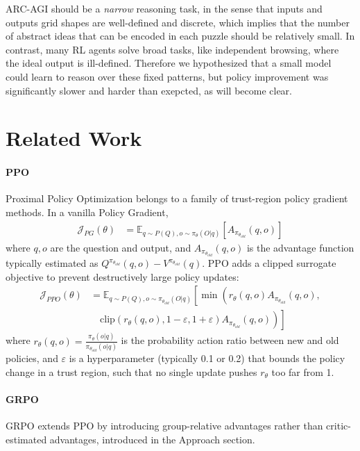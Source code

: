\documentclass{article}
\begin{document}
ARC-AGI should be a \textit{narrow} reasoning task, in the sense that inputs and outputs grid shapes are well-defined and discrete, which implies that the number of abstract ideas that can be encoded in each puzzle should be relatively small. In contrast, many RL agents solve broad tasks, like independent browsing, where the ideal output is ill-defined. Therefore we hypothesized that a small model could learn to reason over these fixed patterns, but policy improvement was significantly slower and harder than exepcted, as will become clear.

\section{Related Work}



\paragraph{PPO} Proximal Policy Optimization \cite{PPO} belongs to a family of trust-region policy gradient methods. In a vanilla Policy Gradient,
\begin{align*}
  \mathcal{J}_{PG}(\theta) & = \mathbb{E}_{q \sim P(Q), o \sim \pi_\theta(O|q)}[A_{\pi_{\theta_{old}}}(q, o)]
\end{align*}
where $q,o$ are the question and output, and $A_{\pi_{\theta_{old}}}(q, o)$ is the advantage function typically estimated as $Q^{\pi_{\theta_{old}}}(q,o) - V^{\pi_{\theta_{old}}}(q)$. PPO adds a clipped surrogate objective to prevent destructively large policy updates:
\begin{align*}
  \mathcal{J}_{PPO}(\theta) & = \mathbb{E}_{q \sim P(Q), o \sim \pi_{\theta_{old}}(O|q)}\left[\min\left(r_\theta(q,o)A_{\pi_{\theta_{old}}}(q,o), \right.\right. \\
                            & \left.\left. \quad \text{clip}(r_\theta(q,o), 1-\varepsilon, 1+\varepsilon)A_{\pi_{\theta_{old}}}(q,o)\right)\right]
\end{align*}
where $r_\theta(q,o) = \frac{\pi_\theta(o|q)}{\pi_{\theta_{old}}(o|q)}$ is the probability action ratio between new and old policies, and $\varepsilon$ is a hyperparameter (typically 0.1 or 0.2) that bounds the policy change in a trust region, such that no single update pushes $r_\theta$ too far from 1.

\paragraph{GRPO} GRPO extends PPO by introducing group-relative advantages rather than critic-estimated advantages, introduced in the Approach section.
\end{document}
